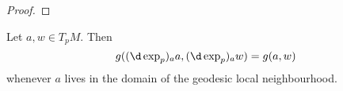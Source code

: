 \documentclass[a4paper]{article}
\begin{document}
\begin{proof}
%
%
%
%
\end{proof}

\begin{cor}
  Let $a, w \in T_p M$. Then
  \[
    g((\d \exp_p)_a a, (\d \exp_p)_a w) = g(a, w)
  \]
  whenever $a$ lives in the domain of the geodesic local neighbourhood.
\end{cor}
\end{document}
